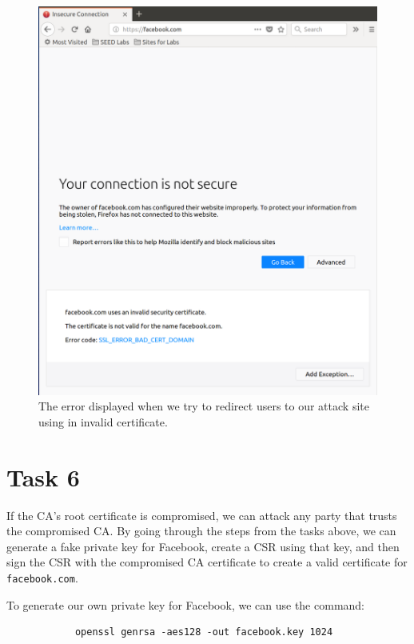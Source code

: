 \documentclass[12pt,letterpaper]{article}
\begin{document}
			\begin{figure}[h!]
				\includegraphics[width=\linewidth]{task-5-3}
				\caption{The error displayed when we try to redirect users to our attack site using in invalid certificate.}
			\end{figure}
		
	\pagebreak
		
	\section*{Task 6}
		If the CA's root certificate is compromised, we can attack any party that trusts the compromised CA. By going through the steps from the tasks above, we can generate a fake private key for Facebook, create a CSR using that key, and then sign the CSR with the compromised CA certificate to create a valid certificate for \texttt{facebook.com}.
		
		To generate our own private key for Facebook, we can use the command:
		
		\begin{verbatim}
			openssl genrsa -aes128 -out facebook.key 1024
		\end{verbatim}
	
\end{document}

